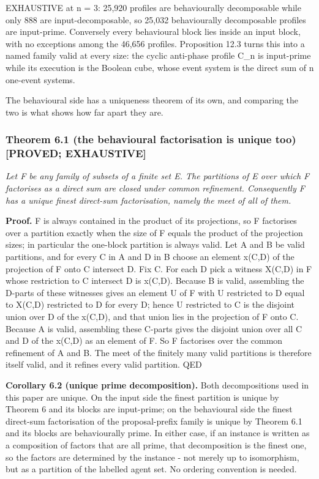 \documentclass[
  11pt,
]{article}
\begin{document}
EXHAUSTIVE at n = 3: 25,920 profiles are behaviourally decomposable
while only 888 are input-decomposable, so 25,032 behaviourally
decomposable profiles are input-prime. Conversely every behavioural
block lies inside an input block, with no exceptions among the 46,656
profiles. Proposition 12.3 turns this into a named family valid at every
size: the cyclic anti-phase profile C\_n is input-prime while its
execution is the Boolean cube, whose event system is the direct sum of n
one-event systems.

The behavioural side has a uniqueness theorem of its own, and comparing
the two is what shows how far apart they are.

\hypertarget{theorem-6.1-the-behavioural-factorisation-is-unique-too-proved-exhaustive}{%
\subsubsection{Theorem 6.1 (the behavioural factorisation is unique too)
{[}PROVED;
EXHAUSTIVE{]}}\label{theorem-6.1-the-behavioural-factorisation-is-unique-too-proved-exhaustive}}

\emph{Let F be any family of subsets of a finite set E. The partitions
of E over which F factorises as a direct sum are closed under common
refinement. Consequently F has a unique finest direct-sum factorisation,
namely the meet of all of them.}

\textbf{Proof.} F is always contained in the product of its projections,
so F factorises over a partition exactly when the size of F equals the
product of the projection sizes; in particular the one-block partition
is always valid. Let A and B be valid partitions, and for every C in A
and D in B choose an element x(C,D) of the projection of F onto C
intersect D. Fix C. For each D pick a witness X(C,D) in F whose
restriction to C intersect D is x(C,D). Because B is valid, assembling
the D-parts of these witnesses gives an element U of F with U restricted
to D equal to X(C,D) restricted to D for every D; hence U restricted to
C is the disjoint union over D of the x(C,D), and that union lies in the
projection of F onto C. Because A is valid, assembling these C-parts
gives the disjoint union over all C and D of the x(C,D) as an element of
F. So F factorises over the common refinement of A and B. The meet of
the finitely many valid partitions is therefore itself valid, and it
refines every valid partition. QED

\textbf{Corollary 6.2 (unique prime decomposition).} Both decompositions
used in this paper are unique. On the input side the finest partition is
unique by Theorem 6 and its blocks are input-prime; on the behavioural
side the finest direct-sum factorisation of the proposal-prefix family
is unique by Theorem 6.1 and its blocks are behaviourally prime. In
either case, if an instance is written as a composition of factors that
are all prime, that decomposition is the finest one, so the factors are
determined by the instance - not merely up to isomorphism, but as a
partition of the labelled agent set. No ordering convention is needed.
\end{document}
